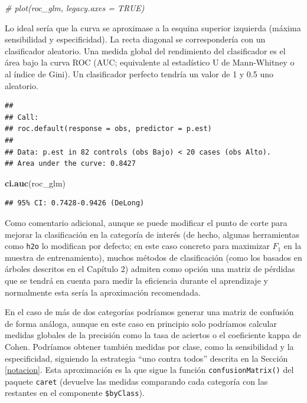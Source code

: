\documentclass[]{book}
\newenvironment{Shaded}{\begin{snugshade}}{\end{snugshade}}
\newcommand{\KeywordTok}[1]{\textcolor[rgb]{0.13,0.29,0.53}{\textbf{#1}}}
\newcommand{\CommentTok}[1]{\textcolor[rgb]{0.56,0.35,0.01}{\textit{#1}}}
\newcommand{\NormalTok}[1]{#1}
\theoremstyle{break}
\theoremstyle{definition}
\theoremstyle{definition}
\theoremstyle{definition}
\theoremstyle{remark}
\begin{document}
\begin{Shaded}
\begin{Highlighting}[]
\CommentTok{# plot(roc_glm, legacy.axes = TRUE)}
\end{Highlighting}
\end{Shaded}

Lo ideal sería que la curva se aproximase a la esquina superior
izquierda (máxima sensibilidad y especificidad). La recta diagonal se
correspondería con un clasificador aleatorio. Una medida global del
rendimiento del clasificador es el área bajo la curva ROC (AUC;
equivalente al estadístico U de Mann-Whitney o al índice de Gini). Un
clasificador perfecto tendría un valor de 1 y 0.5 uno aleatorio.

\begin{Shaded}
\end{Shaded}

\begin{verbatim}
## 
## Call:
## roc.default(response = obs, predictor = p.est)
## 
## Data: p.est in 82 controls (obs Bajo) < 20 cases (obs Alto).
## Area under the curve: 0.8427
\end{verbatim}

\begin{Shaded}
\begin{Highlighting}[]
\KeywordTok{ci.auc}\NormalTok{(roc_glm)}
\end{Highlighting}
\end{Shaded}

\begin{verbatim}
## 95% CI: 0.7428-0.9426 (DeLong)
\end{verbatim}

Como comentario adicional, aunque se puede modificar el punto de corte
para mejorar la clasificación en la categoría de interés (de hecho,
algunas herramientas como \texttt{h2o} lo modifican por defecto; en este
caso concreto para maximizar \(F_1\) en la muestra de entrenamiento),
muchos métodos de clasificación (como los basados en árboles descritos
en el Capítulo 2) admiten como opción una matriz de pérdidas que se
tendrá en cuenta para medir la eficiencia durante el aprendizaje y
normalmente esta sería la aproximación recomendada.

En el caso de más de dos categorías podríamos generar una matriz de
confusión de forma análoga, aunque en este caso en principio solo
podríamos calcular medidas globales de la precisión como la tasa de
aciertos o el coeficiente kappa de Cohen. Podríamos obtener también
medidas por clase, como la sensibilidad y la especificidad, siguiendo la
estrategia ``uno contra todos'' descrita en la Sección \ref{notacion}.
Esta aproximación es la que sigue la función \texttt{confusionMatrix()}
del paquete \texttt{caret} (devuelve las medidas comparando cada
categoría con las restantes en el componente \texttt{\$byClass}).
\end{document}
